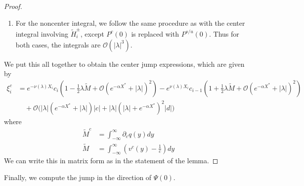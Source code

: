 \documentclass[thesis.tex]{subfiles}
\begin{document}
\begin{lemma}
\begin{proof}
\begin{enumerate}
\item For the noncenter integral, we follow the same procedure as with the center integral involving $\tilde{H}_i^\pm$, except $P^c(0)$ is replaced with $P^{s/u}(0)$. Thus for both cases, the integrals are $\mathcal{O}(|\lambda|^3)$.
\end{enumerate}

We put this all together to obtain the center jump expressions, which are given by
\begin{align*}
\xi^c_i &= e^{-\nu(\lambda)X_i}c_i\left( 1 - \frac{1}{2}\lambda \tilde{M} + \mathcal{O}(e^{-\alpha X^*} +|\lambda|)^2 \right) 
- e^{\nu(\lambda)X_i}c_{i-1}\left( 1 + \frac{1}{2}\lambda \tilde{M} + \mathcal{O}(e^{-\alpha X^*} +|\lambda|)^2 \right) \\
&\quad + \mathcal{O}\Big( |\lambda| (e^{-\alpha X^*} + |\lambda|) |c| + |\lambda| (|\lambda| + e^{-\alpha X^*})^2 |d| \Big)
\end{align*}
where
\begin{align*}
\tilde{M}^c &= \int_{-\infty}^\infty \partial_c q(y) dy \\
\tilde{M} &= \int_{-\infty}^{\infty} \left(v^c(y) - \frac{1}{c}\right) dy
\end{align*}
We can write this in matrix form as in the statement of the lemma.
\end{proof}
\end{lemma}

Finally, we compute the jump in the direction of $\Psi(0)$.
\end{document}
